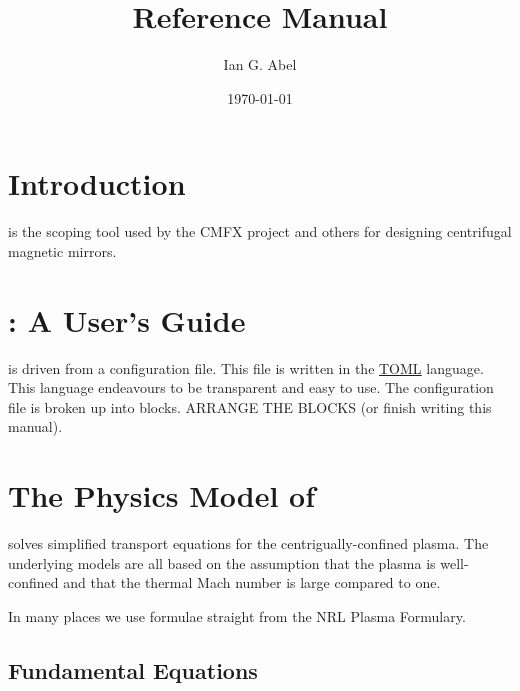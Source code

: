 \documentclass{revtex4}
\begin{document}
\date{\today}

\title{\mctrans{} Reference Manual}
\author{Ian G. Abel}


\maketitle
\section{Introduction}

\mctrans{} is the scoping tool used by the CMFX project and others for designing centrifugal magnetic mirrors.

\section{\mctrans{}: A User's Guide}

\mctrans{} is driven from a configuration file. This file is written in the \href{https://github.com/toml-lang/toml}{TOML} language. This language endeavours
to be transparent and easy to use. The configuration file is broken up into blocks. ARRANGE THE BLOCKS (or finish writing this manual).

\section{The Physics Model of \mctrans{}}

\mctrans{} solves simplified transport equations for the centrigually-confined plasma. The underlying models are all based on the assumption that the plasma is well-confined and that the thermal Mach number is large compared to one.

In many places we use formulae straight from the NRL Plasma Formulary. 

\subsection{Fundamental Equations}
\end{document}

